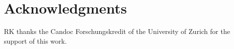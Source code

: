 \documentclass{ws-procs975x65}
\begin{document}
\section*{Acknowledgments}
RK thanks the Candoc Forschungskredit of the University of Zurich for the support of this work.






% 
% 
% 
% 
% 
% 
% 
% 
\end{document}
